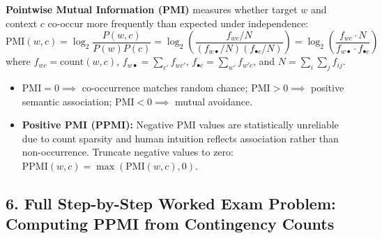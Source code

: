 \documentclass[10pt,a4paper]{article}
\begin{document}
\begin{theoremprompt}[title={\textbf{PMI Definition, Contingency Matrix Formulation \& PPMI Truncation}}]
\footnotesize
\textbf{Pointwise Mutual Information (PMI)} measures whether target $w$ and context $c$ co-occur more frequently than expected under independence:
\begin{equation}
    \text{PMI}(w, c) = \log_2 \frac{P(w, c)}{P(w)P(c)} = \log_2 \left( \frac{f_{wc} / N}{(f_{w\bullet} / N)(f_{\bullet c} / N)} \right) = \log_2 \left( \frac{f_{wc} \cdot N}{f_{w\bullet} \cdot f_{\bullet c}} \right)
\end{equation}
where $f_{wc} = \text{count}(w, c)$, $f_{w\bullet} = \sum_{c'} f_{wc'}$, $f_{\bullet c} = \sum_{w'} f_{w'c}$, and $N = \sum_{i}\sum_{j} f_{ij}$.
\begin{itemize}[leftmargin=10pt,topsep=1pt,itemsep=0.5pt]
    \item $\text{PMI} = 0 \implies$ co-occurrence matches random chance; $\text{PMI} > 0 \implies$ positive semantic association; $\text{PMI} < 0 \implies$ mutual avoidance.
    \item \textbf{Positive PMI (PPMI):} Negative PMI values are statistically unreliable due to count sparsity and human intuition reflects association rather than non-occurrence. Truncate negative values to zero: $\text{PPMI}(w, c) = \max(\text{PMI}(w, c), 0)$.
\end{itemize}
\end{theoremprompt}

\vspace{-1pt}
\subsection*{\color{themeblue} 6. Full Step-by-Step Worked Exam Problem: Computing PPMI from Contingency Counts}
\vspace{-2pt}
\end{document}
